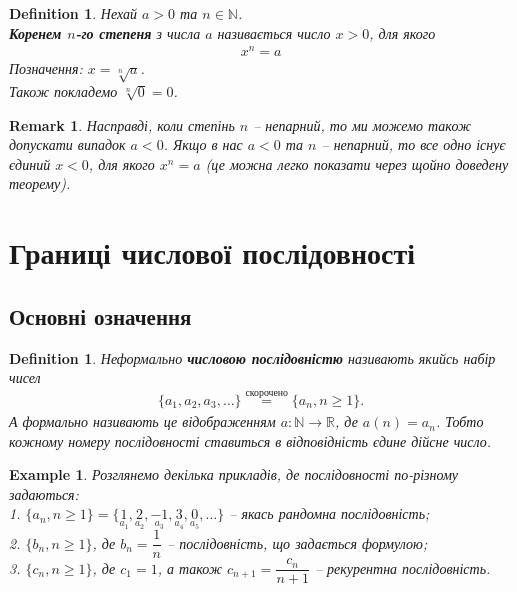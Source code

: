 \documentclass[a4paper, 14pt]{article}
\theoremstyle{theoremdd}
\theoremstyle{theoremdd}
\newtheorem{definition}[theorem]{Definition}
\theoremstyle{theoremdd}
\theoremstyle{theoremdd}
\newtheorem{example}[theorem]{Example}
\theoremstyle{theoremdd}
\theoremstyle{theoremdd}
\newtheorem{remark}[theorem]{Remark}
\theoremstyle{theoremdd}
\theoremstyle{theoremdd}
\begin{document}
	\begin{definition}
	Нехай $a > 0$ та $n \in \mathbb{N}$.\\
	\textbf{Коренем $n$-го степеня} з числа $a$ називається число $x > 0$, для якого
	\begin{align*}
	x^n = a
	\end{align*}
	Позначення: $x = \sqrt[n]{a}$.\\
	Також покладемо $\sqrt[n]{0} = 0$.
	\end{definition}
	
	\begin{remark}
	Насправді, коли степінь $n$ -- непарний, то ми можемо також допускати випадок $a < 0$. Якщо в нас $a < 0$ та $n$ -- непарний, то все одно існує єдиний $x < 0$, для якого $x^n = a$ (це можна легко показати через щойно доведену теорему).
	\end{remark}
	\newpage
	
	\setcounter{section}{2}
	\section{Границі числової послідовності}
	\subsection{Основні означення}
	\begin{definition}
	Неформально \textbf{числовою послідовністю} називають якийсь набір чисел 
	\begin{align*}
	\{a_1,a_2,a_3, \dots\} \overset{\text{скорочено}}{=} \{a_n, n \geq 1\}.
	\end{align*}
	А формально називають це відображенням $a \colon \mathbb{N} \to \mathbb{R}$, де $a(n) = a_n$. Тобто кожному номеру послідовності ставиться в відповідність єдине дійсне число.
	\end{definition}
	
	\begin{example}
	Розглянемо декілька прикладів, де послідовності по-різному задаються:\\
	1. $\{a_n, n \geq 1\} = \{\underset{a_1}{1},\underset{a_2}{2},\underset{a_3}{-1},\underset{a_4}{3},\underset{a_5}{0},\dots\}$ -- якась рандомна послідовність;\\
	2. $\{b_n, n \geq 1\}$, де $b_n = \dfrac{1}{n}$ -- послідовність, що задається формулою;\\
	3. $\{c_n, n \geq 1\}$, де $c_1 = 1$, а також $c_{n+1} = \dfrac{c_n}{n+1}$ -- рекурентна послідовність.
	\end{example}
	
\end{document}
